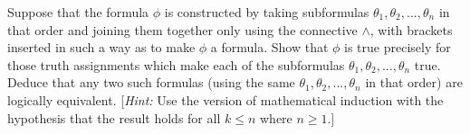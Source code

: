 \documentclass{article}
\theoremstyle{remark}\newtheorem{remark}{Remark}
\theoremstyle{plain}
\begin{document}
 Suppose that the formula $\phi$ is constructed by taking subformulas $\theta_1, \theta_2, ... , \theta_n$ in that order and joining them together only using the connective $\land$, with brackets inserted in such a way as to make $\phi$ a formula. Show that $\phi$ is true precisely for those truth assignments which make each of the subformulas $\theta_1, \theta_2, ... , \theta_n$ true. Deduce that any two such formulas (using the same $\theta_1, \theta_2, ... , \theta_n$ in that order) are logically equivalent. [\textit{Hint:} Use the version of mathematical induction with the hypothesis that the result holds for all $k \leq n$ where $n \geq 1$.]

\end{document}
